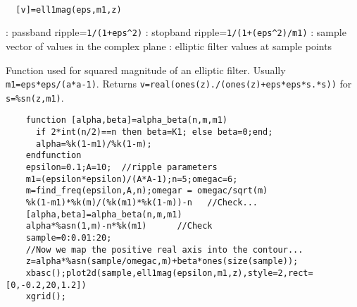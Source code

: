 
\begin{mandesc}
   \\ %
\end{mandesc}
\begin{calling_sequence}
\begin{verbatim}
  [v]=ell1mag(eps,m1,z)  
\end{verbatim}
\end{calling_sequence}
\begin{parameters}
  \begin{varlist}
    : passband ripple=\verb!1/(1+eps^2)!
    : stopband ripple=\verb!1/(1+(eps^2)/m1)!
    : sample vector of values in the complex plane
    : elliptic filter values at sample points
  \end{varlist}
\end{parameters}
\begin{mandescription}
  Function used for squared magnitude of an elliptic filter.
  Usually \verb!m1=eps*eps/(a*a-1)!. Returns 
  \verb!v=real(ones(z)./(ones(z)+eps*eps*s.*s))! for \verb!s=%sn(z,m1)!.
\end{mandescription}
\begin{examples}
  \begin{Verbatim}
    function [alpha,beta]=alpha_beta(n,m,m1)
      if 2*int(n/2)==n then beta=K1; else beta=0;end;
      alpha=%k(1-m1)/%k(1-m);
    endfunction
    epsilon=0.1;A=10;  //ripple parameters
    m1=(epsilon*epsilon)/(A*A-1);n=5;omegac=6;
    m=find_freq(epsilon,A,n);omegar = omegac/sqrt(m)
    %k(1-m1)*%k(m)/(%k(m1)*%k(1-m))-n   //Check...
    [alpha,beta]=alpha_beta(n,m,m1)
    alpha*%asn(1,m)-n*%k(m1)      //Check
    sample=0:0.01:20;
    //Now we map the positive real axis into the contour...
    z=alpha*%asn(sample/omegac,m)+beta*ones(size(sample));
    xbasc();plot2d(sample,ell1mag(epsilon,m1,z),style=2,rect=[0,-0.2,20,1.2])
    xgrid();
  \end{Verbatim}
\end{examples}
\begin{manseealso}
\end{manseealso}
